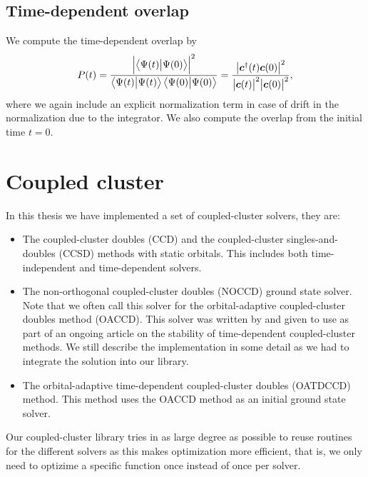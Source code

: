         \subsection{Time-dependent overlap}
            We compute the time-dependent overlap by
            \begin{align}
                P(t)
                =
                \frac{
                    \abs{\braket{\Psi(t)}{\Psi(0)}}^2
                }{
                    \braket{\Psi(t)}\braket{\Psi(0)}
                }
                = \frac{
                    \abs{\boldsymbol{c}^{\dagger}(t)\boldsymbol{c}(0)}^2
                }{
                    \abs{\boldsymbol{c}(t)}^2
                    \abs{\boldsymbol{c}(0)}^2
                },
            \end{align}
            where we again include an explicit normalization term in case of
            drift in the normalization due to the integrator.
            We also compute the overlap from the initial time $t = 0$.

    \section{Coupled cluster}
        \label{sec:cc-solver}
        In this thesis we have implemented a set of coupled-cluster solvers,
        they are:
        \begin{itemize}
            \item The coupled-cluster doubles (CCD) and the coupled-cluster
                singles-and-doubles (CCSD) methods with static orbitals.
                This includes both time-independent and time-dependent solvers.
            \item The non-orthogonal coupled-cluster doubles (NOCCD) ground
                state solver.
                Note that we often call this solver for the orbital-adaptive
                coupled-cluster doubles method (OACCD).
                This solver was written by \citeauthor{rolf-nocc}
                \cite{rolf-nocc} and given to use as part of an ongoing article
                on the stability of time-dependent coupled-cluster methods.
                We still describe the implementation in some detail as we had to
                integrate the solution into our library.
            \item The orbital-adaptive time-dependent coupled-cluster doubles
                (OATDCCD) method.
                This method uses the OACCD method as an initial ground state
                solver.
        \end{itemize}
        Our coupled-cluster library tries in as large degree as possible to
        reuse routines for the different solvers as this makes optimization
        more efficient, that is, we only need to optizime a specific function
        once instead of once per solver.

